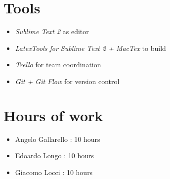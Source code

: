 \newpage
\begin{appendices}
\section{Tools}

\begin{itemize}
	\item \emph{Sublime Text 2} as editor
	\item \emph{LatexTools for Sublime Text 2 + MacTex}  to build
	\item \emph{Trello} for team coordination 
	\item \emph{Git + Git Flow} for version control 
\end{itemize}

\section{Hours of work}

\begin{itemize}
	\item Angelo Gallarello : 10 hours
	\item Edoardo Longo : 10 hours
	\item Giacomo Locci : 10 hours
\end{itemize}




\end{appendices}